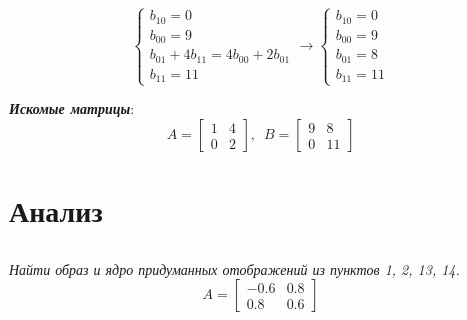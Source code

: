 \documentclass[a5paper, 10pt]{article}
\theoremstyle{definition}
\theoremstyle{plain}
\theoremstyle{remark}
\begin{document}
\begin{equation}
\begin{cases}
b_{1 0} = 0\\
b_{0 0} = 9\\
b_{0 1} + 4 b_{1 1} = 4b_{0 0} + 2b_{0 1}\\
 b_{1 1} = 11
\end{cases}
\to
\begin{cases}
b_{1 0} = 0\\
b_{0 0} = 9\\
b_{0 1} = 8\\
 b_{1 1} = 11
\end{cases}
\end{equation}


\textit{\textbf{Искомые матрицы}}:
\begin{equation}
A=
\begin{bmatrix}
1 & 4\\
0 & 2
\end{bmatrix}
, \, \, \, 
B=
\begin{bmatrix}
9 & 8\\
0 & 11
\end{bmatrix}
\end{equation}


\newpage
\section{Анализ}
\subsection{}
\textit{Найти образ и ядро придуманных отображений из пунктов 1, 2, 13, 14.}\\

\begin{equation}
A =
\begin{bmatrix}
-0.6 & 0.8\\
0.8 & 0.6
\end{bmatrix}
\end{equation}
\end{document}
